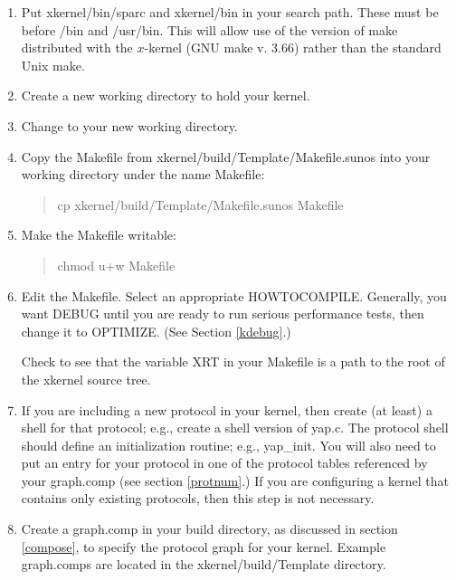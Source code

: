 \begin{enumerate}

\item{}
Put {\sanss xkernel/bin/sparc} and {\sanss xkernel/bin} in
your search path. These must be before
{\sanss /bin} and {\sanss /usr/bin}. This will allow use of
the version of {\sanss make} distributed with the $x$-kernel (GNU make
v. 3.66) rather than the standard Unix {\sanss make}.

\item{}
Create a new working directory to hold your kernel.


\item{}
Change to your new working directory.

\item{}
Copy the Makefile
from {\sanss xkernel/build/Template/Makefile.sunos} into your
working directory under the name Makefile:

\begin{quote}
{\sanss cp xkernel/build/Template/Makefile.sunos Makefile}\\
\end{quote}

\item{}
Make the Makefile writable:
\begin{quote}
{\sanss chmod u+w Makefile}\\
\end{quote}

\item{}
Edit the Makefile.
Select an appropriate {\sanss HOWTOCOMPILE}. Generally, you want {\sanss
DEBUG} until you are ready to run serious performance tests, then
change it to {\sanss OPTIMIZE}. (See Section \ref{kdebug}.)

Check to see that the variable XRT in your Makefile is a path to
the root of the xkernel source tree.


\item{}
If you are including a new protocol in your kernel, then create (at least)
a shell for that protocol; e.g., create a shell version of {\sanss yap.c}.
The protocol shell should define an initialization routine; 
e.g., {\sanss yap\_init}.  You will also need to put an entry for your
protocol in one of the protocol tables referenced by your graph.comp
(see section \ref{protnum}.)
If you are configuring a kernel that contains only existing protocols, 
then this step is not necessary.

\item{}
Create a {\sanss graph.comp} in your build directory, as discussed in
section \ref{compose}, to specify the protocol graph for your kernel.
Example graph.comps are located in the {\sanss xkernel/build/Template}
directory.


\end{enumerate}
